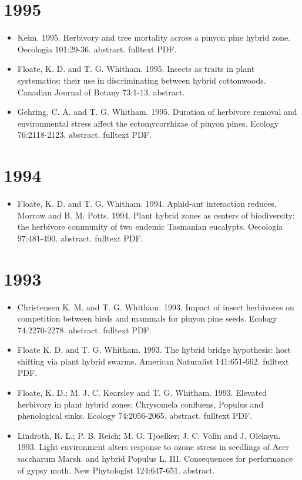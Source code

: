 \documentclass[12pt]{article}
\begin{document}
\section{1995}
\begin{itemize}
\item Keim. 1995. Herbivory and tree mortality across a pinyon pine hybrid
zone. Oecologia 101:29-36. abstract. fulltext PDF.
 
\item Floate, K. D. and T. G. Whitham. 1995. Insects as traits in plant
systematics: their use in discriminating between hybrid
cottonwoods. Canadian Journal of Botany 73:1-13. abstract.
 
\item Gehring, C. A. and T. G. Whitham. 1995. Duration of herbivore removal
and environmental stress affect the ectomycorrhizae of pinyon
pines. Ecology 76:2118-2123. abstract. fulltext PDF.
 
\end{itemize}

\section{1994}
\begin{itemize}
\item Floate, K. D. and T. G. Whitham. 1994. Aphid-ant interaction
reduces. Morrow and B. M. Potts. 1994. Plant hybrid zones as centers
of biodiversity: the herbivore community of two endemic Tasmanian
eucalypts. Oecologia 97:481-490. abstract. fulltext PDF.
 
\end{itemize}

\section{1993}
\begin{itemize}
\item Christensen K. M. and T. G. Whitham. 1993. Impact of insect herbivores
on competition between birds and mammals for pinyon pine
seeds. Ecology 74:2270-2278. abstract. fulltext PDF.
 
\item Floate K. D. and T. G. Whitham. 1993. The hybrid bridge hypothesis:
host shifting via plant hybrid swarms. American Naturalist
141:651-662. fulltext PDF.
 
\item Floate, K. D.; M. J. C. Kearsley and T. G. Whitham. 1993. Elevated
herbivory in plant hybrid zones: Chrysomela confluens, Populus and
phenological sinks. Ecology 74:2056-2065. abstract. fulltext PDF.

\item Lindroth, R. L.; P. B. Reich; M. G. Tjoelker; J. C. Volin and
J. Oleksyn. 1993. Light environment alters response to ozone stress in
seedlings of Acer saccharum Marsh. and hybrid Populus
L. III. Consequences for performance of gypsy moth. New Phytologist
124:647-651. abstract.
\end{itemize}
\end{document}
